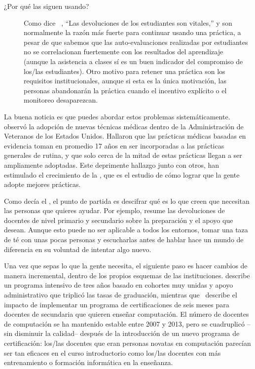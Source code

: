 \begin{description}
\item[¿Por qué las siguen usando?]

Como dice ~\cite{Bark2015}, ``Las devoluciones de los estudiantes son vitales,''
y son normalmente la razón más fuerte para continuar usando una práctica,
a pesar de que sabemos que las auto-evaluaciones realizadas por estudiantes 
no se correlacionan fuertemente con los resultados del aprendizaje~\cite{Star2014,Uttl2017}
(aunque la asistencia a clases sí es un buen indicador del compromiso de los/las estudiantes).
Otro motivo para retener una práctica son los requisitos institucionales,
aunque si esta es la única motivación,
las personas abandonarán la práctica 
cuando el incentivo explícito o el monitoreo desaparezcan.

\end{description}

La buena noticia es que puedes abordar estos problemas sistemáticamente.
\cite{Baue2015} observó  la adopción de nuevas técnicas médicas dentro de la Administración de Veteranos de los Estados Unidos. 
Hallaron que las prácticas médicas basadas en evidencia
toman en promedio 17 años en ser incorporadas a las prácticas generales de rutina,
y que solo cerca de la mitad de estas prácticas llegan a ser ampliamente adoptadas.
Este deprimente hallazgo junto con otros, han estimulado el crecimiento de la
,
que es el estudio de cómo lograr que la gente adopte mejores prácticas.

Como decía el ,
el punto de partida es descifrar qué es lo que creen que necesitan las personas que quieres ayudar.
Por ejemplo, \cite{Yada2016} resume las devoluciones de docentes de nivel primario y secundario sobre la preparación y el apoyo que desean.
Aunque esto puede no ser aplicable a todos los entornos,
tomar una taza de té con unas pocas personas y escucharlas antes de hablar
hace un mundo de diferencia en su voluntad de intentar algo nuevo. 

Una vez que sepas lo que la gente necesita,
el siguiente paso es hacer cambios de manera incremental,
dentro de los propios esquemas de las instituciones.
\cite{Nara2018} describe un programa intensivo de tres años
basado en cohortes muy unidas y apoyo administrativo
que triplicó las tasas de graduación,
mientras que~\cite{Hu2017} describe el impacto de implementar un programa de certificaciones de seis meses para docentes de secundaria que quieren enseñar computación.
El  número de docentes de computación se ha mantenido estable entre 2007 y 2013,
pero se cuadruplicó --sin disminuir la calidad-- después de la introducción de un nuevo programa de certificación:
los/las docentes que eran personas novatas en computación parecían ser tan eficaces en el curso introductorio como los/las docentes con más entrenamiento o formación informática en la enseñanza.



